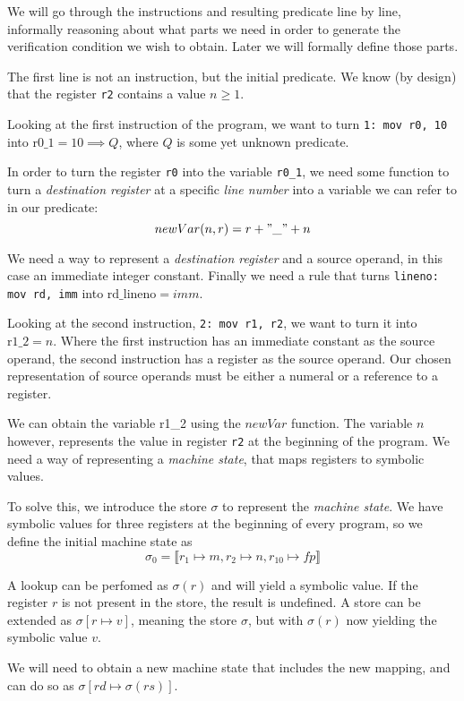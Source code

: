 We will go through the instructions and resulting predicate line by line, informally reasoning about what parts we need in order to generate the verification condition we wish to obtain. Later we will formally define those parts.

The first line is not an instruction, but the initial predicate. We know (by design) that the register \texttt{r2} contains a value $n \geq 1$. 

Looking at the first instruction of the program, we want to turn \texttt{1: mov r0, 10} into $\text{r0\_1} = 10 \implies Q$, where $Q$ is some yet unknown predicate.

In order to turn the register \texttt{r0} into the variable \texttt{r0\_1}, we need some function to turn a \textit{destination register} at a specific \textit{line number} into a variable we can refer to in our predicate:
\[
newVar (n, r) = r + "\_" + n
\]

We need a way to represent a \textit{destination register} and a source operand, in this case an immediate integer constant.
Finally we need a rule that turns \texttt{lineno: mov rd, imm} into $\text{rd\_lineno} = imm$.

Looking at the second instruction, \texttt{2: mov r1, r2}, we want to turn it into $\text{r1\_2} = n$.
Where the first instruction has an immediate constant as the source operand, the second instruction has a register as the source operand. Our chosen representation of source operands must be either a numeral or a reference to a register.

We can obtain the variable r1\_2 using the $newVar$ function. The variable $n$ however, represents the value in register \texttt{r2} at the beginning of the program. We need a way of representing a \textit{machine state}, that maps registers to symbolic values.

To solve this, we introduce the store $\sigma$ to represent the \textit{machine state}. We have symbolic values for three registers at the beginning of every program, so we define the initial machine state as \[\sigma_0 = \llbracket r_1 \mapsto m, r_2 \mapsto n, r_{10} \mapsto fp \rrbracket \]

A lookup can be perfomed as $\sigma(r)$ and will yield a symbolic value. If the register $r$ is not present in the store, the result is undefined. 
A store can be extended as $\sigma[r \mapsto v]$, meaning the store $\sigma$, but with $\sigma(r)$ now yielding the symbolic value $v$.

We will need to obtain a new machine state that includes the new mapping, and can do so as $\sigma[rd \mapsto \sigma(rs)]$.


